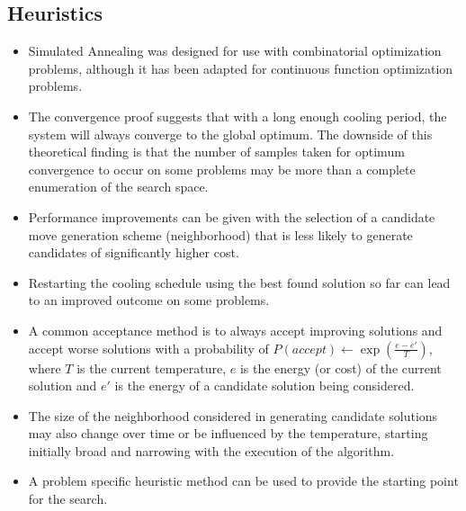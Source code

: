 \subsection{Heuristics}
\begin{itemize}
	\item Simulated Annealing was designed for use with combinatorial optimization problems, although it has been adapted for continuous function optimization problems.
	\item The convergence proof suggests that with a long enough cooling period, the system will always converge to the global optimum. The downside of this theoretical finding is that the number of samples taken for optimum convergence to occur on some problems may be more than a complete enumeration of the search space. 
	\item Performance improvements can be given with the selection of a candidate move generation scheme (neighborhood) that is less likely to generate candidates of significantly higher cost.
	\item Restarting the cooling schedule using the best found solution so far can lead to an improved outcome on some problems.
	\item A common acceptance method is to always accept improving solutions and accept worse solutions with a probability of $P(accept) \leftarrow \exp(\frac{e-e'}{T})$, where $T$ is the current temperature, $e$ is the energy (or cost) of the current solution and $e'$ is the energy of a candidate solution being considered.
	\item The size of the neighborhood considered in generating candidate solutions may also change over time or be influenced by the temperature, starting initially broad and narrowing with the execution of the algorithm.
	\item A problem specific heuristic method can be used to provide the starting point for the search.
\end{itemize}

